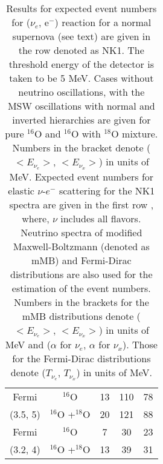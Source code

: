 \documentclass[preprint,12pt]{elsarticle}
\begin{document}
\begin{table}[htbp]
\begin{center}
\begin{tabular}{|c|c|c|c|c|}
\hline
\hline
Fermi \cite{Yoshida2005,Yoshida2008} & $^{16}$O & 13 & 110 & 78 \\
(3.5, 5) & $^{16}$O +$^{18}$O & 20 & 121 & 88 \\
\hline
Fermi & $^{16}$O & 7 & 30 & 23 \\
(3.2, 4) & $^{16}$O +$^{18}$O & 13 & 39 & 31 \\
\hline
\end{tabular}
\end{center}
\caption{
Results for expected event numbers 
for ($\nu_e$, e$^{-}$) reaction for a normal supernova \cite{Nakazato2018} (see text) are given in the row denoted as NK1. 
The threshold energy of the detector is taken to be 5 MeV.
Cases without neutrino oscillations, with the MSW oscillations with normal and inverted hierarchies are given for pure $^{16}$O and $^{16}$O with $^{18}$O mixture. Numbers in the bracket denote ($<E_{\nu_e}>$, $<E_{\nu_x}>$) in units of MeV.  
Expected event numbers for elastic $\nu$-$e^{-}$ scattering for the NK1 spectra are given in the first row \cite{Nakazato2018},  
where, $\nu$ includes all flavors.
Neutrino spectra of modified Maxwell-Boltzmann (denoted as mMB) and Fermi-Dirac distributions are also used for the estimation of the event numbers. 
Numbers in the brackets for the mMB distributions denote ($<E_{\nu_e}>$, $<E_{\nu_x}>$) in units of MeV and ($\alpha$ for $\nu_e$, $\alpha$ for $\nu_x$).  Those for the Fermi-Dirac distributions denote ($T_{\nu_e}$, $T_{\nu_x}$) in units of MeV.   }
\end{table}
\end{document}

